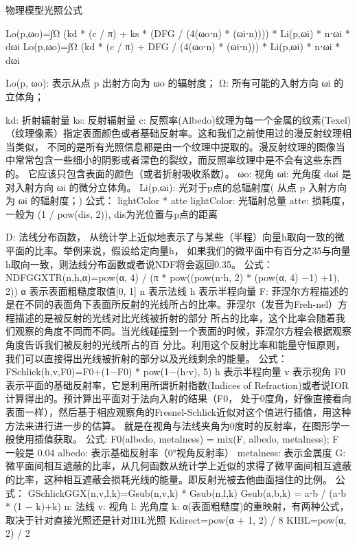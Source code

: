 
物理模型光照公式

Lo(p,ωo)=∫Ω (kd * (c / π) + ks * (DFG / (4(ωo⋅n) * (ωi⋅n)))) * Li(p,ωi) * n⋅ωi * dωi
Lo(p,ωo)=∫Ω (kd * (c / π) + DFG / (4(ωo⋅n) * (ωi⋅n))) * Li(p,ωi) * n⋅ωi * dωi


Lo(p, ωo):  表示从点 p 出射方向为 ωo 的辐射度；
Ω:  所有可能的入射方向 ωi 的立体角；

kd: 折射辐射量
ks: 反射辐射量
c:  反照率(Albedo)纹理为每一个金属的纹素(Texel)（纹理像素）指定表面颜色或者基础反射率。这和我们之前使用过的漫反射纹理相当类似，
    不同的是所有光照信息都是由一个纹理中提取的。漫反射纹理的图像当中常常包含一些细小的阴影或者深色的裂纹，而反照率纹理中是不会有这些东西的。
    它应该只包含表面的颜色（或者折射吸收系数）。
ωo: 视角
ωi: 光角度
dωi 是对入射方向 ωi 的微分立体角。
Li(p,ωi): 光对于p点的总辐射度( 从点 p 入射方向为 ωi 的辐射度；)
  公式： lightColor * atte
    lightColor: 光辐射总量
    atte: 损耗度，一般为 (1 / pow(dis, 2)), dis为光位置与p点的距离

D:  法线分布函数， 从统计学上近似地表示了与某些（半程）向量h取向一致的微平面的比率。举例来说，假设给定向量h，
    如果我们的微平面中有百分之35与向量h取向一致，则法线分布函数或者说NDF将会返回0.35。
    公式：
      NDFGGXTR(n,h,α)=pow(α, 4) / (π * pow((pow(n⋅h, 2) * (pow(α, 4) −1) +1), 2))
      α 表示表面粗糙度取值[0, 1]
      n 表示法线
      h 表示半程向量
F:  菲涅尔方程描述的是在不同的表面角下表面所反射的光线所占的比率。菲涅尔（发音为Freh-nel）方程描述的是被反射的光线对比光线被折射的部分
    所占的比率，这个比率会随着我们观察的角度不同而不同。当光线碰撞到一个表面的时候，菲涅尔方程会根据观察角度告诉我们被反射的光线所占的百
    分比。利用这个反射比率和能量守恒原则，我们可以直接得出光线被折射的部分以及光线剩余的能量。
    公式：
      FSchlick(h,v,F0)=F0+(1−F0) * pow(1−(h⋅v), 5)
      h 表示半程向量
      v 表示视角
      F0 表示平面的基础反射率，它是利用所谓折射指数(Indices of Refraction)或者说IOR计算得出的。预计算出平面对于法向入射的结果（F0，
        处于0度角，好像直接看向表面一样），然后基于相应观察角的Fresnel-Schlick近似对这个值进行插值，用这种方法来进行进一步的估算。
        就是在视角与法线夹角为0度时的反射率，在图形学一般使用插值获取。
        公式:
          F0(albedo, metalness) = mix(F, albedo, metalness);
          F 一般是 0.04
          albedo: 表示基础反射率（0°视角反射率）
          metalness: 表示金属度
G:  微平面间相互遮蔽的比率，从几何函数从统计学上近似的求得了微平面间相互遮蔽的比率，这种相互遮蔽会损耗光线的能量。即反射光被去他曲面挡住的比例。
    公式：
      GSchlickGGX(n,v,l,k)=Gsub(n,v,k) * Gsub(n,l,k)
        Gsub(a,b,k) = a⋅b / (a⋅b * (1 − k)+k)
        n: 法线
        v: 视角
        l: 光角度
        k: α(表面粗糙度)的重映射，有两种公式，取决于针对直接光照还是针对IBL光照
          Kdirect=pow(α + 1, 2) / 8
          KIBL=pow(α, 2) / 2